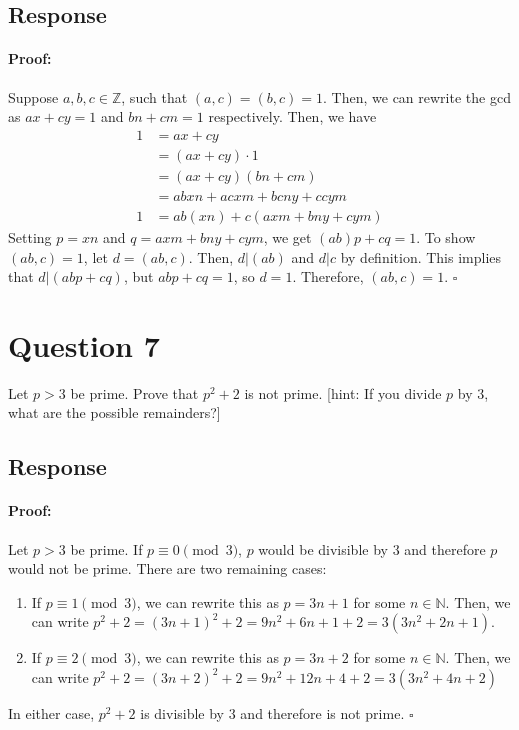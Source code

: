 \documentclass [12pt] {article}
\newcommand{\N}{\mathbb{N}}
\newcommand{\Z}{\mathbb{Z}}
\newenvironment{proof}{\paragraph{Proof:}}{\hfill$\square$}
\begin{document}
\subsection*{Response}
\begin{proof}
    Suppose $a, b, c \in \Z$, such that $(a, c) = (b, c) = 1$. Then, we can rewrite the gcd as
    $ax + cy = 1$ and $bn + cm = 1$ respectively. Then, we have
    \begin{align*}
        1 &= ax + cy  \\
          &= (ax + cy) \cdot 1  \\
          &= (ax + cy)(bn + cm) \\
          &= abxn + acxm + bcny + ccym \\
        1 &= ab(xn) + c(axm + bny + cym)
    \end{align*}
    Setting $p = xn$ and $q = axm + bny + cym$, we get $(ab)p + cq = 1$. To show $(ab, c) = 1$,
    let $d = (ab, c)$. Then, $d | (ab)$ and $d | c$ by definition. This implies that 
    $d | (abp + cq)$, but $abp + cq = 1$, so $d = 1$. Therefore, $(ab, c) = 1$.
\end{proof}
\newpage


\section*{Question 7}
Let $p>3$ be prime. Prove that $p^2+2$ is not prime. [hint: If you divide $p$ by $3$, what are the possible remainders?]
\subsection*{Response}
\begin{proof}
    Let $p > 3$ be prime. If $p \equiv 0 \pmod{3}$, $p$ would be divisible by $3$ and therefore 
    $p$ would not be prime. There are two remaining cases:
    \begin{enumerate}[label=\textit{Case (\roman*):},leftmargin=*]
        \item If $p \equiv 1 \pmod{3}$, we can rewrite this as $p = 3n + 1$ for some $n \in \N$.
            Then, we can write $p^2 + 2 = (3n + 1)^2 + 2 = 9n^2 + 6n + 1 + 2 = 3(3n^2 + 2n + 1)$.
        \item If $p \equiv 2 \pmod{3}$, we can rewrite this as $p = 3n + 2$ for some $n \in \N$.
            Then, we can write $p^2 + 2 = (3n + 2)^2 + 2 = 9n^2 + 12n + 4 + 2 = 3(3n^2 + 4n + 2)$
    \end{enumerate}
    In either case, $p^2 + 2$ is divisible by $3$ and therefore is not prime.
\end{proof}
\end{document}
